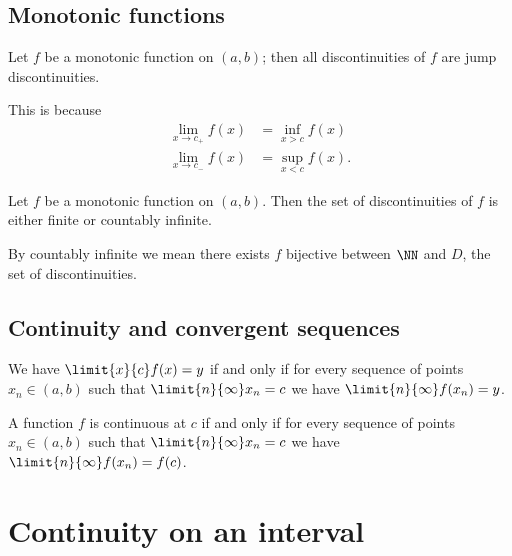 \documentclass[12pt, a4paper]{article}
\begin{document}
\subsection{Monotonic functions}

\begin{mdthm}
    Let \(f\) be a monotonic function on \((a,b)\); then all discontinuities of \(f\) are jump discontinuities.
\end{mdthm}

\begin{mdnote}
    This is because 
    \[\begin{aligned}
        \lim_{x \to c_+} f(x) &= \inf_{x >c} f(x) \\
        \lim_{x \to c_-} f(x) &= \sup_{x <c} f(x).
    \end{aligned}\]
\end{mdnote}

\begin{mdcor}
    Let \(f\) be a monotonic function on \((a,b)\). Then the set of discontinuities of \(f\) is either finite or countably infinite.
\end{mdcor}

\begin{mdremark}
    By countably infinite we mean there exists \(f\) bijective between \(\NN\) and \(D\), the set of discontinuities.
\end{mdremark}

\subsection{Continuity and convergent sequences}

\begin{mdthm}
    We have \(\limit{x}{c} f(x)=y\) if and only if for every sequence of points \(x_n \in (a,b)\) such that \(\limit{n}{\infty} x_n =c\) we have \(\limit{n}{\infty} f(x_n)=y\).
\end{mdthm}

\begin{corollary}
    A function \(f\) is continuous at \(c\) if and only if for every sequence of points \(x_n \in (a,b)\) such that \(\limit{n}{\infty} x_n =c\) we have \(\limit{n}{\infty} f(x_n)=f(c)\).
\end{corollary}

\section{Continuity on an interval}
\end{document}
